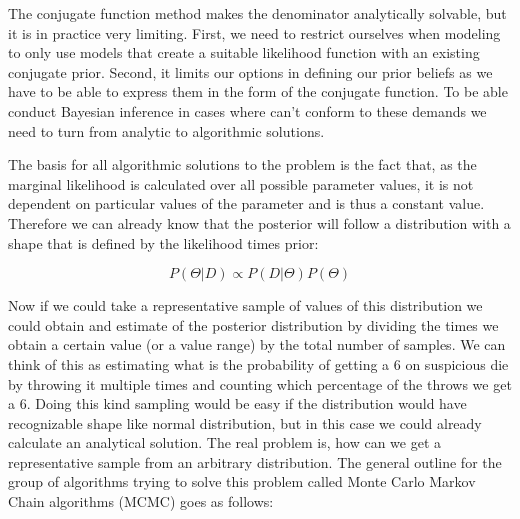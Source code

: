 \documentclass[12pt,a4paper,leqno]{report}
\theoremstyle{plain}
\theoremstyle{definition}
\theoremstyle{remark}
\begin{document}
The conjugate function method makes the denominator analytically solvable, but it
is in practice very limiting. First, we need to restrict ourselves when
modeling to only use models that create a suitable likelihood function with an existing
conjugate prior. Second, it limits our options in defining our prior
beliefs as we have to be able to express them in the form of the conjugate function. To
be able conduct Bayesian inference in cases where can't conform to these demands we need
to turn from analytic to algorithmic solutions.

The basis for all algorithmic solutions to the problem is the fact that,
as the marginal likelihood is calculated over all possible parameter values, it is
not dependent on particular values of the parameter and is thus a constant value.
Therefore we can already know that the posterior will follow a distribution
with a shape that is defined by the likelihood times prior:

\begin{def}\label{bayespropto}
    \begin{equation}
        P(\Theta|D) \propto P(D|\Theta)P(\Theta)
    \end{equation}
\end{def}

Now if we could take a representative sample of values of this distribution we could
obtain and estimate of the posterior distribution by dividing the times we obtain a
certain value (or a value range) by the total number of samples. We can think of this
as estimating what is the probability of getting a 6 on
suspicious die by throwing it multiple times and counting which percentage of the
throws we get a 6. Doing this kind sampling would be easy if the distribution would have
recognizable shape like normal distribution, but in this case we could already calculate an analytical
solution. The real problem is, how can we get a representative sample from an arbitrary
distribution. The general outline for the group of algorithms trying to solve this problem called
Monte Carlo Markov Chain algorithms (MCMC) goes as follows:
\end{document}

